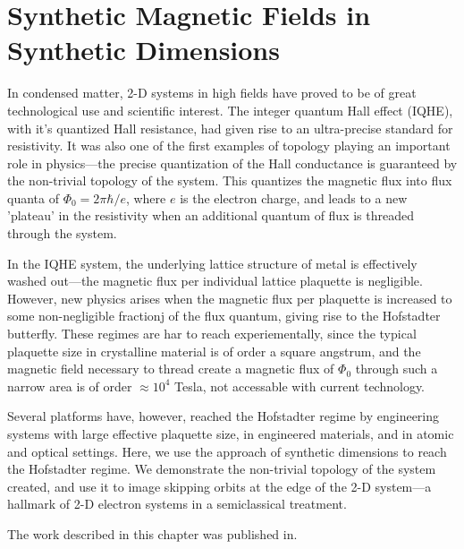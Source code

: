 \renewcommand{\thechapter}{6}

\chapter{Synthetic Magnetic Fields in Synthetic Dimensions}


In condensed matter, 2-D systems in high fields have proved to be of great technological use and scientific interest. The integer quantum Hall effect (IQHE)\cite{Klitzing1980}, with it's quantized Hall resistance, had given rise to an ultra-precise standard for resistivity. It was also one of the first examples of topology playing an important role in physics---the precise quantization of the Hall conductance is guaranteed by the non-trivial topology of the system\cite{Thouless1982}. This quantizes the magnetic flux into flux quanta of $\Phi_0=2\pi\hbar/e$, where $e$ is the electron charge, and leads to a new 'plateau' in the resistivity when an additional quantum of flux is threaded through the system. 

In the IQHE system, the underlying lattice structure of metal is effectively washed out---the magnetic flux per individual lattice plaquette is negligible. However, new physics arises when the magnetic flux per plaquette is increased to some non-negligible fractionj of the flux quantum, giving rise to the Hofstadter butterfly\cite{Hofstadter1976}. These regimes are har to reach experiementally, since the typical plaquette size in crystalline material is of order a square angstrum, and the magnetic field necessary to thread create a magnetic flux of $\Phi_0$ through such a narrow area is of order $\approx10^4$ Tesla, not accessable with current technology. 

Several platforms have, however, reached the Hofstadter regime by engineering systems with large effective plaquette size, in engineered materials\cite{Geisler2004,Hunt2013}, and in atomic\cite{Jaksch2003,Aidelsburger2013,Miyake2013,Jotzu2014,Aidelsburger2014,Mancini2015} and optical\cite{Hafezi2013} settings. Here, we use the approach of synthetic dimensions \cite{Celi2014} to reach the Hofstadter regime. We demonstrate the non-trivial topology of the system created, and use it to image skipping orbits at the edge of the 2-D system---a hallmark of 2-D electron systems in a semiclassical treatment. 

The work described in this chapter was published in\cite{Stuhl2015}.

